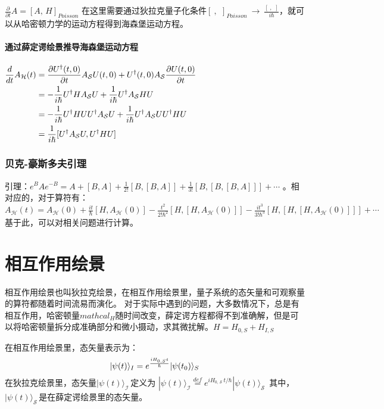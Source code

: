 \documentclass[%
 reprint,
 amsmath,amssymb,
 aps,
]{revtex4-1}
\begin{document}
$\frac {\partial }{\partial {t}} A = [A,\,H]_{Poisson}$ 
在这里需要通过狄拉克量子化条件$[\ ,\,\ ]_{Poisson}\ \to \ \frac {[\ ,\,\ ]}{i\hbar }$，就可以从哈密顿力学的运动方程得到海森堡运动方程。

\paragraph{通过薛定谔绘景推导海森堡运动方程}
$\begin{aligned}{d \over dt}A_{\mathcal {H}}(t)&={\frac {\partial U^{\dagger }(t,0)}{\partial t}}A_{\mathcal {S}}U(t,0)+U^{\dagger }(t,0)A_{\mathcal {S}}{\frac {\partial U(t,0)}{\partial t}}\\&=-{1 \over i\hbar }U^{\dagger }HA_{\mathcal {S}}U+{1 \over i\hbar }U^{\dagger }A_{\mathcal {S}}HU\\&=-{1 \over i\hbar }U^{\dagger }HUU^{\dagger }A_{\mathcal {S}}U+{1 \over i\hbar }U^{\dagger }A_{\mathcal {S}}UU^{\dagger }HU\\&={1 \over i\hbar }[U^{\dagger }A_{\mathcal {S}}U,U^{\dagger }HU]\\\end{aligned}$

\subsubsection{贝克-豪斯多夫引理}
引理：${e^{B}Ae^{-B}}=A+[B,A]+{\frac {1}{2!}}[B,[B,A]]+{\frac {1}{3!}}[B,[B,[B,A]]]+\cdots$ 。相对应的，对于算符有：$ A_{\mathcal {H}}(t)=A_{\mathcal {H}}(0)+{\frac {it}{\hbar }}[H,A_{\mathcal {H}}(0)]-{\frac {t^{2}}{2!\hbar ^{2}}}[H,[H,A_{\mathcal {H}}(0)]]-{\frac {it^{3}}{3!\hbar ^{3}}}[H,[H,[H,A_{\mathcal {H}}(0)]]]+\cdots$基于此，可以对相关问题进行计算。

\section{\label{sec:level1}相互作用绘景}

相互作用绘景也叫狄拉克绘景，在相互作用绘景里，量子系统的态矢量和可观察量的算符都随着时间流易而演化。
对于实际中遇到的问题，大多数情况下，总是有相互作用，哈密顿量$mathcal_{H}$随时间改变，薛定谔方程都得不到准确解，但是可以将哈密顿量拆分成准确部分和微小摄动，求其微扰解。$H = H_{0,S} + H_{I,S}$

在相互作用绘景里，态矢量表示为：$$|\psi(t) \rangle_I = e^ {iH_{0,S}t\over \hbar}|\psi(t_0) \rangle_S$$
在狄拉克绘景里，态矢量$|\psi (t)\rangle _{\mathcal {I}}\,\!$定义为
$|\psi (t)\rangle _{\mathcal {I}}{\stackrel {def}{=}}e^{iH_{0,\,{\mathcal {S}}}\,t/\hbar }|\psi (t)\rangle _{\mathcal {S}}\,\!$
其中，$|\psi (t)\rangle _{\mathcal {S}}\,\!$是在薛定谔绘景里的态矢量。
\end{document}
